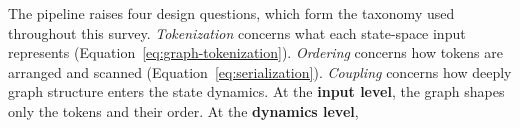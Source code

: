 \documentclass[acmsmall]{acmart}
\begin{document}
The pipeline raises four design questions, which form the taxonomy used
throughout this survey. \emph{Tokenization} concerns what each state-space
input represents (Equation~\eqref{eq:graph-tokenization}). \emph{Ordering}
concerns how tokens are arranged and scanned
(Equation~\eqref{eq:serialization}). \emph{Coupling} concerns how deeply
graph structure enters the state dynamics. At the \textbf{input level}, the
graph shapes only the tokens and their order. At the \textbf{dynamics level},
\end{document}
